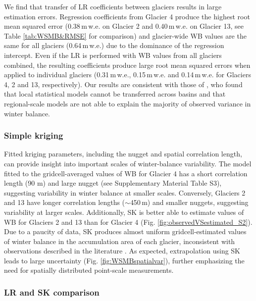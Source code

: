 \documentclass[twocolumn, letterpaper]{igs}
\begin{document}
We find that transfer of LR coefficients between glaciers results in large estimation errors. Regression coefficients from Glacier 4 produce the highest root mean squared error (0.38\,m\,w.e. on Glacier 2 and 0.40\,m\,w.e. on Glacier 13, see Table \ref{tab:WSMB&RMSE} for comparison) and glacier-wide WB values are the same for all glaciers (0.64\,m\,w.e.) due to the dominance of the regression intercept. Even if the LR is performed with WB values from all glaciers combined, the resulting coefficients produce large root mean squared errors when applied to  individual glaciers (0.31\,m\,w.e., 0.15\,m\,w.e. and 0.14\,m\,w.e. for Glaciers 4, 2 and 13, respectively). Our results are consistent with those of \cite{Grunewald2013}, who found that local statistical models cannot be transferred across basins and that regional-scale models are not able to explain the majority of observed variance in winter balance. 

\subsubsection{Simple kriging}

Fitted kriging parameters, including the nugget and spatial correlation length, can provide insight into important scales of winter-balance variability. The model fitted to the gridcell-averaged values of WB for Glacier 4 has a short correlation length (90 m) and large nugget (see Supplementary Material Table S3), suggesting variability in winter balance at smaller scales. Conversely, Glaciers 2 and 13 have longer correlation lengths ($\sim$450\,m) and smaller nuggets, suggesting variability at larger scales. Additionally, SK is better able to estimate values of WB for Glaciers 2 and 13 than for Glacier 4 (Fig. \ref{fig:observedVSestimated_S2}). Due to a paucity of data, SK produces almost uniform gridcell-estimated values of winter balance in the accumulation area of each glacier,  inconsistent with observations described in the literature \citep[e.g.][]{Machguth2006, Grabiec2011}. As expected, extrapolation using SK leads to large uncertainty (Fig. \ref{fig:WSMBspatialvar}), further emphasizing the need for spatially distributed point-scale measurements. 

\subsubsection{LR and SK comparison}
 
\end{document}
